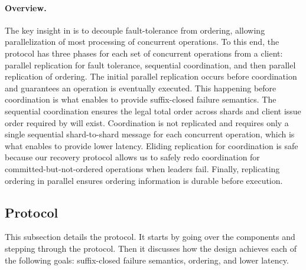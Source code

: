 \paragraph{\sys{} Overview.}
The key insight in \sys{} is to decouple fault-tolerance from ordering, allowing
parallelization of most processing of concurrent operations. To this end, the
\sys{} protocol has three phases for each set of concurrent operations from a
client: parallel replication for fault tolerance, sequential coordination, and
then parallel replication of ordering. The initial parallel replication occurs
before coordination and guarantees an operation is eventually executed.
This happening before coordination is what enables \sys{} to provide
suffix-closed failure semantics.  The sequential coordination ensures the legal
total order across shards and client issue order required by \mdl{} will exist.
Coordination is not replicated and requires only a single sequential
shard-to-shard message for each concurrent operation, which is what enables
\sys{} to provide lower latency.  Eliding replication for coordination is safe
because our recovery protocol allows us to safely redo coordination for
committed-but-not-ordered operations when leaders fail.  Finally,
replicating ordering in parallel ensures ordering information is durable before
execution.




\subsection{Protocol}
This subsection details the \sys{} protocol.
It starts by going over the components and stepping through the protocol.
Then it discusses how the design achieves each of the following goals:
suffix-closed failure semantics,
\mdl{} ordering,
and lower latency.


